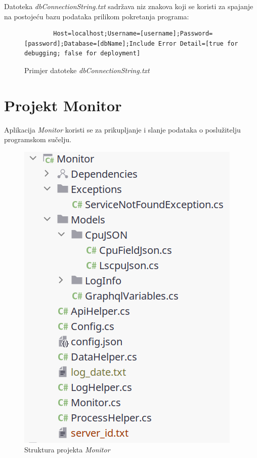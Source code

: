 \documentclass[zavrsnirad]{fer}
\begin{document}
Datoteka \textit{dbConnectionString.txt} sadržava niz znakova koji se koristi za spajanje na postojeću bazu podataka prilikom pokretanja programa:
\begin{figure}[htb]
	\centering
	\begin{lstlisting}
		Host=localhost;Username=[username];Password=[password];Database=[dbName];Include Error Detail=[true for debugging; false for deployment]
	\end{lstlisting}
	\caption{Primjer datoteke \textit{dbConnectionString.txt}}
\end{figure}
\FloatBarrier

\chapter{Projekt Monitor}
Aplikacija \textit{Monitor} koristi se za prikupljanje i slanje podataka o poslužitelju programskom sučelju.

\begin{figure}[htb!]
	\centering
	\includegraphics[width=0.4\linewidth]{images/monitor_structure.png} 
	\caption{Struktura projekta \textit{Monitor}}
	\label{slk:monitor_structure.png}
\end{figure}
\FloatBarrier
\end{document}
